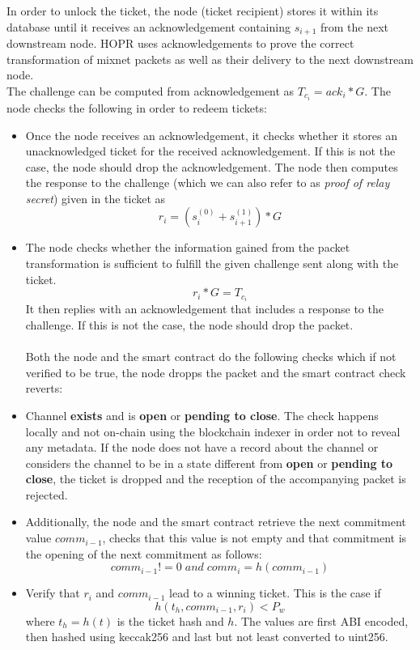In order to unlock the ticket, the node (ticket recipient) stores it within its database until it receives an acknowledgement containing $s_{i+1}$ from the next downstream node. HOPR uses acknowledgements to prove the correct transformation of mixnet packets as well as their delivery to the next downstream node.
\\The challenge can be computed from acknowledgement as $T_{c_i}=ack_i*G$. The node checks the following in order to redeem tickets:
\begin{itemize}
\item Once the node receives an acknowledgement, it checks whether it stores an unacknowledged ticket for the received acknowledgement.
If this is not the case, the node should drop the acknowledgement.
\newline The node then computes the response to the challenge (which we can also refer to as \textit{proof of relay secret}) given in the ticket as $$r_i=(s_i^{(0)}+s_{i+1}^{(1)})*G$$
\item  The node checks whether the information gained from the packet transformation is sufficient to fulfill the given challenge sent along with the ticket. $$r_i*G=T_{c_i}$$
It then replies with an acknowledgement that includes a response to the challenge. If this is not the case, the node should drop the packet.
\\~\\  Both the node and the smart contract do the following checks which if not verified to be true, the node dropps the packet and the smart contract check reverts:
\item Channel \textbf{exists} and is \textbf{open} or \textbf{pending to close}. The check happens locally and not on-chain using the blockchain indexer in order not to reveal any metadata. If the node does not have a record about the channel or considers the channel to be in a state different from \textbf{open} or \textbf{pending to close}, the ticket is dropped and the reception of the accompanying packet is rejected.
\item Additionally, the node and the smart contract retrieve the next commitment value $comm_{i-1}$, checks that this value is not empty and that commitment is the opening of the next commitment as follows:
$$ comm_{i-1} != 0 \; and \; comm_{i}=h(comm_{i-1})$$
\item Verify that $r_i$ and $comm_{i-1}$ lead to a winning ticket.
This is the case if $$h(t_h, comm_{i-1}, r_i) <P_w$$ where $t_h=h(t)$ is the ticket hash and $h$. The values are first ABI encoded, then hashed using keccak256 and last but not least converted to uint256.

\end{itemize}
